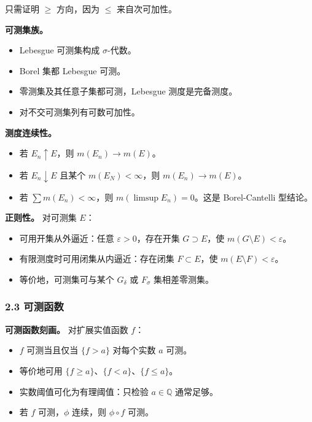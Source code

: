 \documentclass[
UTF8]{ctexart}
\providecommand{\tightlist}{%
\setlength{\itemsep}{0pt}\setlength{\parskip}{0pt}}
\begin{document}
只需证明 \(\ge\) 方向，因为 \(\le\) 来自次可加性。

\textbf{可测集族。}

\begin{itemize}
    \tightlist
  \item
    Lebesgue 可测集构成 \(\sigma\)-代数。
  \item
    Borel 集都 Lebesgue 可测。
  \item
    零测集及其任意子集都可测，Lebesgue 测度是完备测度。
  \item
    对不交可测集列有可数可加性。
\end{itemize}

\textbf{测度连续性。}

\begin{itemize}
    \tightlist
  \item
    若 \(E_n\uparrow E\)，则 \(m(E_n)\to m(E)\)。
  \item
    若 \(E_n\downarrow E\) 且某个 \(m(E_N)<\infty\)，则
    \(m(E_n)\to m(E)\)。
  \item
    若 \(\sum m(E_n)<\infty\)，则 \(m(\limsup E_n)=0\)。这是
    Borel-Cantelli 型结论。
\end{itemize}

\textbf{正则性。} 对可测集 \(E\)：

\begin{itemize}
    \tightlist
  \item
    可用开集从外逼近：任意 \(\varepsilon>0\)，存在开集 \(G\supset E\)，使
    \(m(G\setminus E)<\varepsilon\)。
  \item
    有限测度时可用闭集从内逼近：存在闭集 \(F\subset E\)，使
    \(m(E\setminus F)<\varepsilon\)。
  \item
    等价地，可测集可与某个 \(G_\delta\) 或 \(F_\sigma\) 集相差零测集。
\end{itemize}

\subsubsection{2.3 可测函数}\label{ux53efux6d4bux51fdux6570}

\textbf{可测函数刻画。} 对扩展实值函数 \(f\)：

\begin{itemize}
    \tightlist
  \item
    \(f\) 可测当且仅当 \(\{f>a\}\) 对每个实数 \(a\) 可测。
  \item
    等价地可用 \(\{f\ge a\}\)、\(\{f<a\}\)、\(\{f\le a\}\)。
  \item
    实数阈值可化为有理阈值：只检验 \(a\in\mathbb Q\) 通常足够。
  \item
    若 \(f\) 可测，\(\phi\) 连续，则 \(\phi\circ f\) 可测。
\end{itemize}
\end{document}
